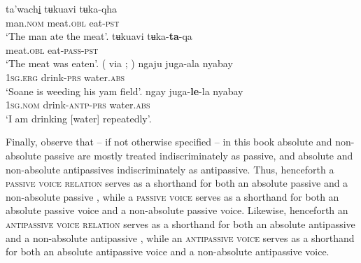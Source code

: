 \ea {} \citep[249f.]{givon:2011}
	\ea\label{ex:Ute:eat:a}
	\gll	ta'wach\underline{i}	tʉkuavi				tʉka-qha 			\\
			man.\textsc{nom} 		meat.\textsc{obl} 	eat-\textsc{pst} 	\\
	\glt	‘The man ate the meat’.
	\ex\label{ex:Ute:eat:b}
	\gll	tʉkuavi				tʉka-\textbf{ta}-qa 				\\
			meat.\textsc{obl}	eat-\textsc{pass-pst}	\\
	\glt	‘The meat was eaten’.
	\z 
\z
\ea {} (\citealt[38]{austin:1982} via \citealt[201]{kittila:2002}; \citeyear[347]{kittila:2015})
	\ea\label{ex:Bandjalang:drink:a}
	\gll	ngaju				juga-ala			nyabay				\\
			\textsc{1sg.erg} 	drink-\textsc{prs} 	water.\textsc{abs}	\\
	\glt	‘Soane is weeding his yam field’.
	\ex\label{ex:Bandjalang:drink:b}
	\gll	ngay				juga-\textbf{le}-la			{\ob}nyabay{\cb}		\\
			\textsc{1sg.nom}	drink-\textsc{antp-prs}		{\db}water.\textsc{abs}	\\
	\glt	‘I am drinking [water] repeatedly’.
	\z
\z

Finally, observe that -- if not otherwise specified -- in this book absolute and non-absolute passive are mostly treated indiscriminately as passive, and absolute and non-absolute antipassives indiscriminately as antipassive. Thus, henceforth a \textsc{passive voice relation} serves as a shorthand for both an absolute passive  and a non-absolute passive , while a \textsc{passive voice} serves as a shorthand for both an absolute passive voice and a non-absolute passive voice. Likewise, henceforth an \textsc{antipassive voice relation} serves as a shorthand for both an absolute antipassive  and a non-absolute antipassive , while an \textsc{antipassive voice} serves as a shorthand for both an absolute antipassive voice and a non-absolute antipassive voice.

